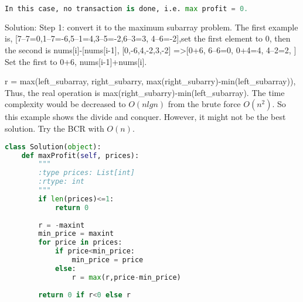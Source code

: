 \documentclass[../specific-algorithms.tex]{subfiles}
\begin{document}
\begin{examples}
\begin{lstlisting}[language=Python]
In this case, no transaction is done, i.e. max profit = 0.
\end{lstlisting}

Solution: Step 1: convert it to the maximum subarray problem. The first example is, [7–7=0,1–7=-6,5–1=4,3–5=-2,6–3=3, 4–6=-2],set the first element to 0, then the second is nums[i]-[nums[i-1], [0,-6,4,-2,3,-2] =>[0+6, 6–6=0, 0+4=4, 4–2=2, ] Set the first to 0+6, nums[i-1]+nums[i].

r = max(left\_subarray, right\_subarry, max(right\_subarry)-min(left\_subarray)), Thus, the real operation is max(right\_subarry)-min(left\_subarray). The time complexity would be decreased to $O(nlgn)$ from the brute force $O(n^2)$. So this example shows the divide and conquer. However, it might not be the best solution. Try the BCR with $O(n)$.
\begin{lstlisting}[language=Python]
class Solution(object):
    def maxProfit(self, prices):
        """
        :type prices: List[int]
        :rtype: int
        """
        if len(prices)<=1:
            return 0
    
        r = -maxint
        min_price = maxint
        for price in prices:
            if price<min_price:
                min_price = price
            else:
                r = max(r,price-min_price)
            
        return 0 if r<0 else r
\end{lstlisting}
\end{examples}
\end{document}

